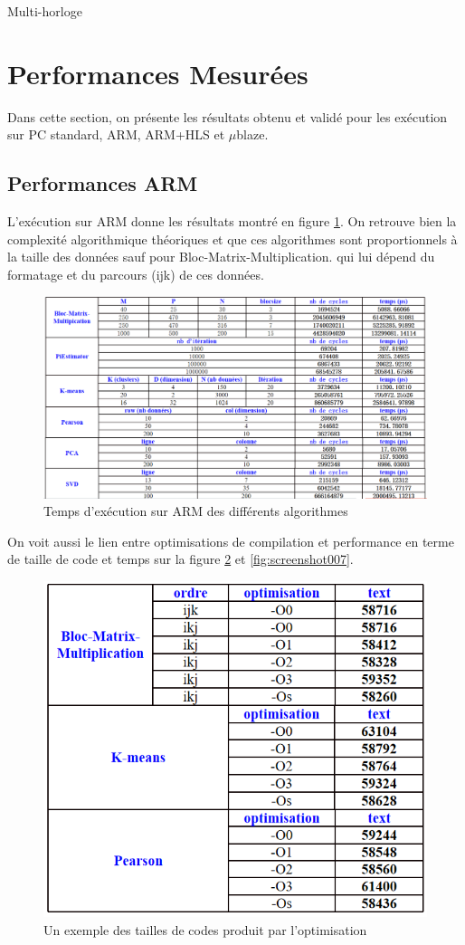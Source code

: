 \documentclass[12pt,a4paper]{ieee}
\begin{document}
\label{SmartClock}
Multi-horloge

\section{Performances Mesurées}
Dans cette section, on présente les résultats obtenu et validé pour les exécution sur PC standard, ARM, ARM+HLS et $\mu$blaze.
\subsection{Performances ARM}
L'exécution sur ARM donne les résultats montré en figure \ref{fig:screenshot005}. On retrouve bien la complexité algorithmique théoriques et que ces algorithmes sont proportionnels à la taille des données sauf pour Bloc-Matrix-Multiplication. qui lui dépend du formatage et du parcours (ijk) de ces données.
\begin{figure}[H]
	\centering
	\includegraphics[width=\linewidth]{soft/screenshot005}
	\caption {Temps d'exécution sur ARM des différents algorithmes}
	\label{fig:screenshot005}
\end{figure}
On voit aussi le lien entre optimisations de compilation et performance en terme de taille de code et temps sur la figure \ref{fig:screenshot006} et \ref{fig:screenshot007}.
\begin{figure}[H]
	\centering
	\includegraphics[width=0.6\linewidth]{soft/screenshot006}
	\caption{Un exemple des tailles de codes produit par l'optimisation}
	\label{fig:screenshot006}
\end{figure}
\end{document}
